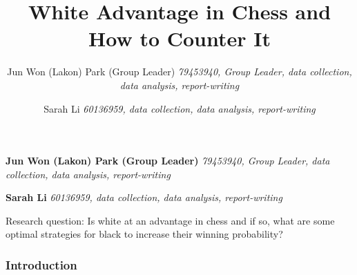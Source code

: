 \documentclass[11pt,]{article}
\title{White Advantage in Chess and How to Counter It  }
\author{\Large Jun Won (Lakon) Park (Group Leader)\vspace{0.05in} \newline\normalsize\emph{79453940, Group Leader, data collection, data analysis, report-writing}   \and \Large Sarah Li\vspace{0.05in} \newline\normalsize\emph{60136959, data collection, data analysis, report-writing}  }
\date{}
\newcommand*{\authorfont}{\fontfamily{phv}\selectfont}
\renewenvironment{abstract}
 {{%
    \setlength{\leftmargin}{0mm}
    \setlength{\rightmargin}{\leftmargin}%
  }%
  \relax}
 {\endlist}
\begin{document}
	
%

{%
\setlength{\parindent}{0pt}
\thispagestyle{plain}
{\fontsize{18}{20}\selectfont\raggedright 
\maketitle  %

}

{
   \vskip 13.5pt\relax \normalsize\fontsize{11}{12} 
\textbf{\authorfont Jun Won (Lakon) Park (Group Leader)} \hskip 15pt \emph{\small 79453940, Group Leader, data collection, data analysis, report-writing}   \par \textbf{\authorfont Sarah Li} \hskip 15pt \emph{\small 60136959, data collection, data analysis, report-writing}   

}

}








\begin{abstract}

    \hbox{\vrule height .2pt width 39.14pc}

    \vskip 8.5pt %

\noindent Research question: Is white at an advantage in chess and if so, what are
some optimal strategies for black to increase their winning probability?


    \hbox{\vrule height .2pt width 39.14pc}


\end{abstract}


\vskip -8.5pt



\noindent  

\hypertarget{introduction}{%
\subsubsection{\texorpdfstring{\textbf{Introduction}}{Introduction}}\label{introduction}}
\end{document}
